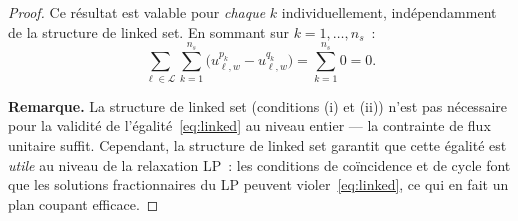 \documentclass[a4paper,10pt,titlepage,leqno]{article}
\begin{document}
\begin{theorybox}
\begin{proof}
Ce résultat est valable pour \emph{chaque} $k$ individuellement, indépendamment de la structure de linked set. En sommant sur $k = 1, \ldots, n_s$~:
\[
  \sum_{\ell \in \mathcal{L}} \sum_{k=1}^{n_s} \bigl( u_{\ell,w}^{p_k} - u_{\ell,w}^{q_k} \bigr) = \sum_{k=1}^{n_s} 0 = 0.
\]

\textbf{Remarque.} La structure de linked set (conditions (i) et (ii)) n'est pas nécessaire pour la validité de l'égalité~\eqref{eq:linked} au niveau entier --- la contrainte de flux unitaire suffit. Cependant, la structure de linked set garantit que cette égalité est \emph{utile} au niveau de la relaxation LP~: les conditions de coïncidence et de cycle font que les solutions fractionnaires du LP peuvent violer~\eqref{eq:linked}, ce qui en fait un plan coupant efficace. \qedhere
\end{proof}
\end{theorybox}
\end{document}
